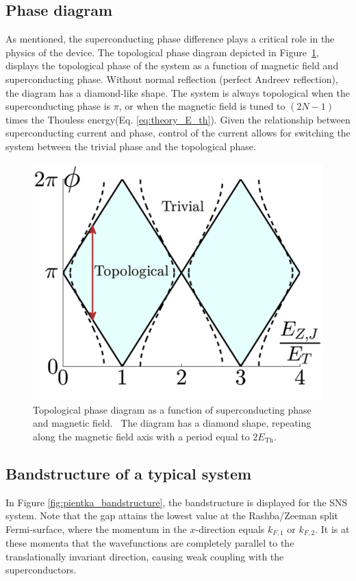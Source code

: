     \subsection{Phase diagram}
        As mentioned, the superconducting phase difference plays a critical role in the physics of the device.
        The topological phase diagram depicted in Figure~\ref{fig:pientka_phase_diagram}, displays the topological phase of the system as a function of magnetic field and superconducting phase.
        Without normal reflection (perfect Andreev reflection), the diagram has a diamond-like shape.
        The system is always topological when the superconducting phase is $\pi$, or when the magnetic field is tuned to $(2N-1)$ times the Thouless energy(Eq. \ref{eq:theory_E_th}).
        Given the relationship between superconducting current and phase, control of the current allows for switching the system between the trivial phase and the topological phase.
        
        \begin{figure}[!htb]
        \centering
        \includegraphics[width=0.5\columnwidth]{figures/pientka_phase_diagram}
        \caption{Topological phase diagram as a function of superconducting phase and magnetic field.~\cite{pientka_topological_2017}
        The diagram has a diamond shape, repeating along the magnetic field axis with a period equal to $2 E_\text{Th}$.
        }
        \label{fig:pientka_phase_diagram}
        \end{figure}
            
    \subsection{Bandstructure of a typical system}
        In Figure \ref{fig:pientka_bandstructure}, the bandstructure is displayed for the SNS system.
        Note that the gap attains the lowest value at the Rashba/Zeeman split Fermi-surface, where the momentum in the $x$-direction equals $k_{F,1}$ or $k_{F,2}$.
        It is at these momenta that the wavefunctions are completely parallel to the translationally invariant direction, causing weak coupling with the superconductors.

